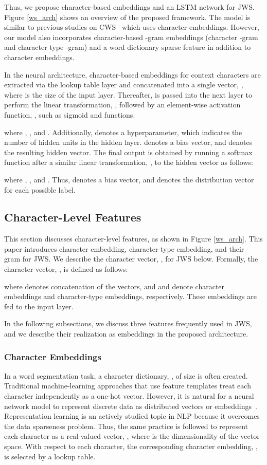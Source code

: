 \documentclass[11pt]{article}
\begin{document}
Thus, we propose character-based embeddings and an LSTM network for JWS.
Figure \ref{ws_arch} shows an overview of the proposed framework. The model is
similar to previous studies on CWS~\cite{chen-EtAl:2015:EMNLP2} which uses
character embeddings. However, our model also incorporates character-based
-gram embeddings (character -gram and character type -gram) and a
word dictionary sparse feature in addition to character embeddings.

In the neural architecture, character-based embeddings for context characters
are extracted via the lookup table layer and concatenated into a single
vector,
, where  is the size of the input layer. 
Thereafter,  is passed into the next layer to perform the linear
transformation, ,  followed by an element-wise activation
function, , such as sigmoid and  functions:

where ,
, and . 
Additionally,  denotes a hyperparameter, which indicates the number of
hidden units in the hidden layer.  denotes a bias vector, and
 denotes the resulting hidden vector. The final output is obtained
by running a softmax function after a similar linear transformation,
, to the hidden vector as follows:

where  ,
, and . Thus,
 denotes a bias vector, and   denotes the distribution
vector for each possible label.


\subsection{Character-Level Features}
This section discusses character-level features, as shown in Figure
\ref{ws_arch}. This paper introduces character embedding, character-type
embedding, and their -gram for JWS. We describe the character vector,
, for JWS below. Formally, the character vector, ,
is defined as follows:

where  denotes concatenation of the vectors, and  and
 denote character embeddings and character-type embeddings,
respectively. These embeddings are fed to the input layer.

In the following subsections, we discuss three features frequently used in
JWS, and we describe their realization as embeddings in the proposed
architecture.

\subsubsection{Character Embeddings}

In a word segmentation task, a character dictionary, , of size  is
often created. 
Traditional machine-learning approaches that use feature templates treat each
character independently as a one-hot vector.
However, it is natural for a neural network model to represent discrete data
as distributed vectors or
embeddings~\cite{Bengio:2003:NPL:944919.944966,collobert:2008}. Representation
learning is an actively studied topic in NLP because it overcomes the data
sparseness problem. Thus, the same practice is followed to represent each
character as a real-valued vector,   , where  is the dimensionality of the vector space. 
With respect to each character, the corresponding character embedding,
, is selected by a lookup table. 
\end{document}

